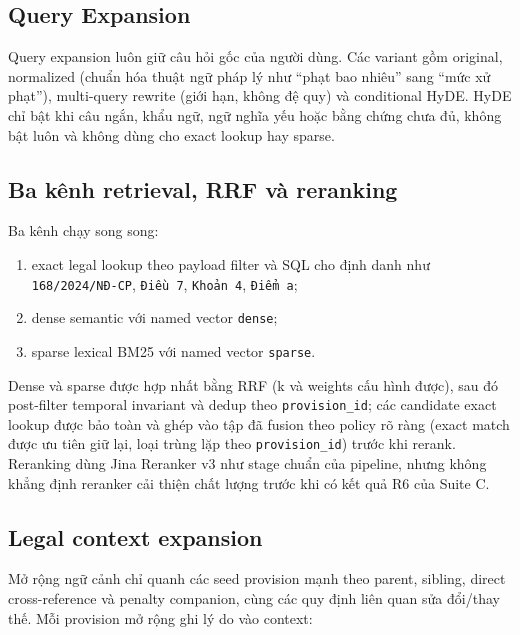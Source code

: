 \documentclass[a4paper,12pt]{extreport}
\newcommand{\code}[1]{\texttt{#1}}
\begin{document}
\subsection{Query Expansion}

Query expansion luôn giữ câu hỏi gốc của người dùng. Các variant gồm original, normalized (chuẩn hóa thuật ngữ pháp lý như ``phạt bao nhiêu'' sang ``mức xử phạt''), multi-query rewrite (giới hạn, không đệ quy) và conditional HyDE. HyDE chỉ bật khi câu ngắn, khẩu ngữ, ngữ nghĩa yếu hoặc bằng chứng chưa đủ, không bật luôn và không dùng cho exact lookup hay sparse.

\subsection{Ba kênh retrieval, RRF và reranking}

Ba kênh chạy song song:

\begin{enumerate}
  \item \begin{sloppypar} exact legal lookup theo payload filter và SQL cho định danh như \code{168/2024/NĐ-CP}, \code{Điều 7}, \code{Khoản 4}, \code{Điểm a}; \end{sloppypar}
  \item dense semantic với named vector \code{dense};
  \item sparse lexical BM25 với named vector \code{sparse}.
\end{enumerate}

Dense và sparse được hợp nhất bằng RRF (k và weights cấu hình được), sau đó post-filter temporal invariant và dedup theo \code{provision\_id}; các candidate exact lookup được bảo toàn và ghép vào tập đã fusion theo policy rõ ràng (exact match được ưu tiên giữ lại, loại trùng lặp theo \code{provision\_id}) trước khi rerank. Reranking dùng Jina Reranker v3 như stage chuẩn của pipeline, nhưng không khẳng định reranker cải thiện chất lượng trước khi có kết quả R6 của Suite C.

\subsection{Legal context expansion}

Mở rộng ngữ cảnh chỉ quanh các seed provision mạnh theo parent, sibling, direct cross-reference và penalty companion, cùng các quy định liên quan sửa đổi/thay thế. Mỗi provision mở rộng ghi lý do vào context:
\end{document}
